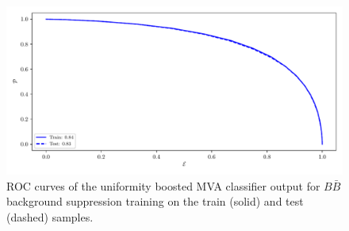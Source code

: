 \begin{figure}[H]
\centering
\captionsetup{width=0.8\linewidth}
\includegraphics[width=\linewidth]{fig/addendums/uBBcC_roc}
\caption{ROC curves of the uniformity boosted MVA classifier output for $B\bar B$ background suppression training on the train (solid) and test (dashed) samples.}
\end{figure}